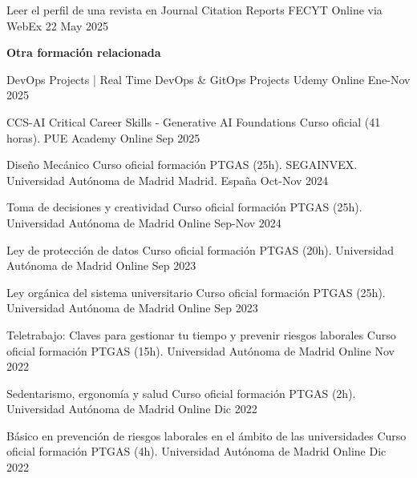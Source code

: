 \begin{cvhonors}
   \cvhonor
   {Leer el perfil de una revista en Journal Citation Reports } %
   {FECYT} %
   {Online via WebEx} %
   {22 May 2025} %
\end{cvhonors}

\textbf{Otra formación relacionada}
\begin{cvhonors}	
   \cvhonor
	{DevOps Projects | Real Time DevOps \& GitOps Projects} %
	{Udemy} %
	{Online} %
	{Ene-Nov 2025} %

   \cvhonor
	{CCS-AI Critical Career Skills - Generative AI Foundations} %
	{Curso oficial (41 horas). PUE Academy} %
	{Online} %
	{Sep 2025} %

  \cvhonor
	{Diseño Mecánico} %
	{Curso oficial formación PTGAS (25h). SEGAINVEX. Universidad Autónoma de Madrid} %
	{Madrid. España} %
	{Oct-Nov 2024} %
    
   \cvhonor
	{Toma de decisiones y creatividad} %
	{Curso oficial formación PTGAS (25h). Universidad Autónoma de Madrid} %
	{Online} %
	{Sep-Nov 2024} %
	
   \cvhonor
	{Ley de protección de datos} %
	{Curso oficial formación PTGAS (20h). Universidad Autónoma de Madrid} %
	{Online} %
	{Sep 2023} %
	
   \cvhonor
	{Ley orgánica del sistema universitario} %
	{Curso oficial formación PTGAS (25h). Universidad Autónoma de Madrid} %
	{Online} %
	{Sep 2023} %

   \cvhonor
	{Teletrabajo: Claves para gestionar tu tiempo y prevenir riesgos laborales} %
	{Curso oficial formación PTGAS (15h). Universidad Autónoma de Madrid} %
	{Online} %
	{Nov 2022} %
	
   \cvhonor
	{Sedentarismo, ergonomía y salud} %
	{Curso oficial formación PTGAS (2h). Universidad Autónoma de Madrid} %
	{Online} %
	{Dic 2022} %

   \cvhonor
	{Básico en prevención de riesgos laborales en el ámbito de las universidades} %
	{Curso oficial formación PTGAS (4h). Universidad Autónoma de Madrid} %
	{Online} %
	{Dic 2022} %


\end{cvhonors}
